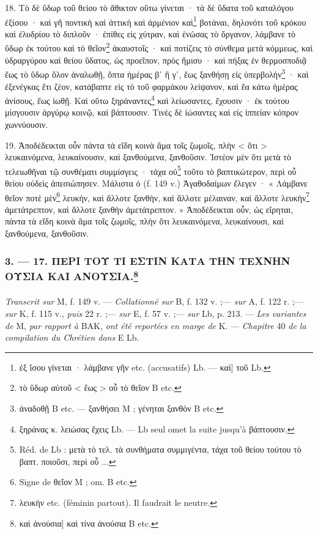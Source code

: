 \documentclass[landscape, a4paper, 11pt, oneside, polutonikogreek, french]{article}
\begin{document}
18. Τὸ δὲ ὕδωρ τοῦ θείου τὸ ἄθικτον οὕτω γίνεται · τὰ δὲ ὕδατα τοῦ καταλόγου ἐξίσου · καὶ γῆ ποντικὴ καὶ ἀττικὴ καὶ ἀρμένιον καὶ\footnote{ἐξ ἴσου γίνεται · λάμβανε γῆν etc. (accusatifs) Lb. --- καὶ] τοῦ Lb.} βοτάναι, δηλονότι τοῦ κρόκου καὶ ἐλυδρίου τὸ διπλοῦν · ἐπίθες εἰς χύτραν, καὶ ἑνώσας τὸ ὄργανον, λάμβανε τὸ ὕδωρ ἐκ τούτου καὶ τὸ θεῖον\footnote{τὸ ὕδωρ αὐτοῦ < ἕως > οὗ τὸ θεῖον B etc.} ἀκαυστοῖς · καὶ ποτίζεις τὸ σύνθεμα μετὰ κόμμεως, καὶ ὑδραργύρου καὶ θείου ὕδατος, ὡς προεῖπον, πρὸς ἥμισυ · καὶ πήξας ἐν θερμοσποδιᾷ ἕως τὸ ὕδωρ ὅλον ἀναλωθῇ, ὄπτα ἡμέρας βʹ ἢ γʹ, ἕως ξανθήσῃ εἰς ὑπερβολήν\footnote{ἀναδοθῇ B etc. --- ξανθήσει M ; γένηται ξανθὸν B etc.} · καὶ ἐξενέγκας ἔτι ζέον, κατάβαπτε εἰς τὸ τοῦ φαρμάκου λείψανον, καὶ ἔα κάτω ἡμέρας ἀνίσους, ἕως ἰωθῇ. Καὶ οὕτω ξηράναντες\footnote{ξηράνας κ. λειώσας ἔχεις Lb. --- Lb seul omet la suite jusqu'à βάπτουσιν.} καὶ λείωσαντες, ἔχουσιν · ἐκ τούτου μίσγουσιν ἀργύρῳ κοινῷ, καὶ βάπτουσιν. Τινὲς δὲ ἰώσαντες καὶ εἰς ἱππείαν κόπρον χωννύουσιν.

19. Ἀποδέδεικται οὖν πάντα τὰ εἴδη κοινὰ ἅμα τοῖς ζωμοῖς, πλὴν < ὅτι > λευκαινόμενα, λευκαίνουσιν, καὶ ξανθούμενα, ξανθοῦσιν. Ἰστέον μὲν ὅτι μετὰ τὸ τελειωθῆναι τῷ συνθέματι συμμίσγεις · τάχα οὐ\footnote{Réd. de Lb : μετὰ τὸ τελ. τὰ συνθήματα συμμιγέντα, τάχα τοῦ θείου τούτου τὸ βαπτ. ποιοῦσι, περὶ οὗ ...} τοῦτο τὸ βαπτικώτερον, περὶ οὗ θείου οὐδεὶς ἀπεσιώπησεν. Μάλιστα ὁ (f. 149 v.) Ἀγαθοδαίμων ἔλεγεν · « Λάμβανε θεῖον ποτὲ μὲν\footnote{Signe de θεῖον M ; om. B etc.} λευκὴν, καὶ ἄλλοτε ξανθὴν, καὶ ἄλλοτε μέλαιναν, καὶ ἄλλοτε λευκὴν\footnote{λευκὴν etc. (féminin partout). Il faudrait le neutre.} ἀμετάτρεπτον, καὶ ἄλλοτε ξανθὴν ἀμετάτρεπτον. » Ἀποδέδεικται οὖν, ὡς εἴρηται, πάντα τὰ εἴδη κοινὰ ἅμα τοῖς ζωμοῖς, πλὴν ὅτι λευκαινόμενα, λευκαίνουσι, καὶ ξανθούμενα, ξανθοῦσιν.

\bigskip
\centerline{\EightStarTaper}
\centerline{\EightStarTaper\EightStarTaper}
\bigskip

\subsubsection[3. --- 17. ΠΕΡΙ ΤΟΥ ΤΙ ΕΣΤΙΝ ΚΑΤΑ ΤΗΝ ΤΕΧΝΗΝ ΟΥΣΙΑ ΚΑΙ ΑΝΟΥΣΙΑ.]{3. --- 17. ΠΕΡΙ ΤΟΥ ΤΙ ΕΣΤΙΝ ΚΑΤΑ ΤΗΝ ΤΕΧΝΗΝ ΟΥΣΙΑ ΚΑΙ ΑΝΟΥΣΙΑ.\footnote{καὶ ἀνούσια] καὶ τίνα ἀνούσια B etc.}}
\paragraph{}
\emph{Transcrit sur} M, f. 149 v. --- \emph{Collationné sur} B, f. 132 v. ;--- \emph{sur} A, f. 122 r. ;--- \emph{sur} K, f. 115 v., \emph{puis} 22 r. ;--- \emph{sur} E, f. 57 v. ;--- \emph{sur} Lb, p. 213. --- \emph{Les variantes de} M, \emph{par rapport à} BAK, \emph{ont été reportées en marge de} K. --- \emph{Chapitre} 40 \emph{de la compilation du Chrétien dans} E Lb.
\end{document}

